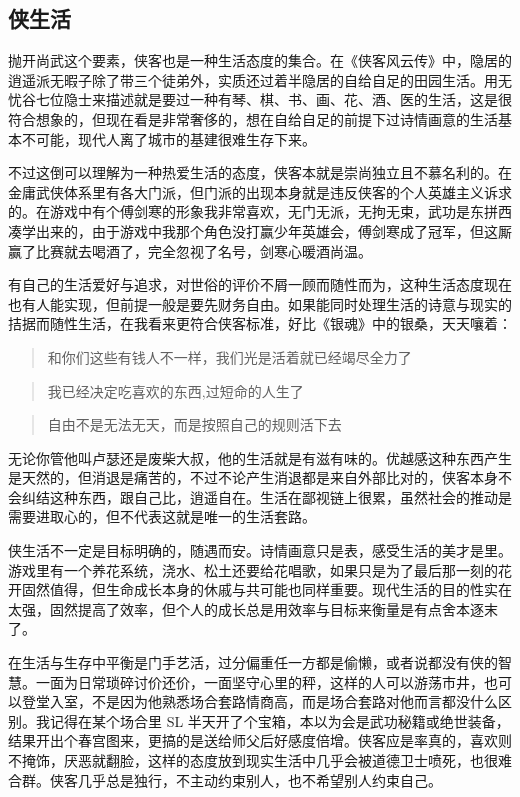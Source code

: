 \documentclass[
  letterpaper,
  DIV=11,
  numbers=noendperiod]{scrreprt}
\begin{document}
\subsection{侠生活}\label{ux4fa0ux751fux6d3b}

抛开尚武这个要素，侠客也是一种生活态度的集合。在《侠客风云传》中，隐居的逍遥派无暇子除了带三个徒弟外，实质还过着半隐居的自给自足的田园生活。用无忧谷七位隐士来描述就是要过一种有琴、棋、书、画、花、酒、医的生活，这是很符合想象的，但现在看是非常奢侈的，想在自给自足的前提下过诗情画意的生活基本不可能，现代人离了城市的基建很难生存下来。

不过这倒可以理解为一种热爱生活的态度，侠客本就是崇尚独立且不慕名利的。在金庸武侠体系里有各大门派，但门派的出现本身就是违反侠客的个人英雄主义诉求的。在游戏中有个傅剑寒的形象我非常喜欢，无门无派，无拘无束，武功是东拼西凑学出来的，由于游戏中我那个角色没打赢少年英雄会，傅剑寒成了冠军，但这厮赢了比赛就去喝酒了，完全忽视了名号，剑寒心暖酒尚温。

有自己的生活爱好与追求，对世俗的评价不屑一顾而随性而为，这种生活态度现在也有人能实现，但前提一般是要先财务自由。如果能同时处理生活的诗意与现实的拮据而随性生活，在我看来更符合侠客标准，好比《银魂》中的银桑，天天嚷着：

\begin{quote}
和你们这些有钱人不一样，我们光是活着就已经竭尽全力了
\end{quote}

\begin{quote}
我已经决定吃喜欢的东西,过短命的人生了
\end{quote}

\begin{quote}
自由不是无法无天，而是按照自己的规则活下去
\end{quote}

无论你管他叫卢瑟还是废柴大叔，他的生活就是有滋有味的。优越感这种东西产生是天然的，但消退是痛苦的，不过不论产生消退都是来自外部比对的，侠客本身不会纠结这种东西，跟自己比，逍遥自在。生活在鄙视链上很累，虽然社会的推动是需要进取心的，但不代表这就是唯一的生活套路。

侠生活不一定是目标明确的，随遇而安。诗情画意只是表，感受生活的美才是里。游戏里有一个养花系统，浇水、松土还要给花唱歌，如果只是为了最后那一刻的花开固然值得，但生命成长本身的休戚与共可能也同样重要。现代生活的目的性实在太强，固然提高了效率，但个人的成长总是用效率与目标来衡量是有点舍本逐末了。

在生活与生存中平衡是门手艺活，过分偏重任一方都是偷懒，或者说都没有侠的智慧。一面为日常琐碎讨价还价，一面坚守心里的秤，这样的人可以游荡市井，也可以登堂入室，不是因为他熟悉场合套路情商高，而是场合套路对他而言都没什么区别。我记得在某个场合里
SL
半天开了个宝箱，本以为会是武功秘籍或绝世装备，结果开出个春宫图来，更搞的是送给师父后好感度倍增。侠客应是率真的，喜欢则不掩饰，厌恶就翻脸，这样的态度放到现实生活中几乎会被道德卫士喷死，也很难合群。侠客几乎总是独行，不主动约束别人，也不希望别人约束自己。
\end{document}
